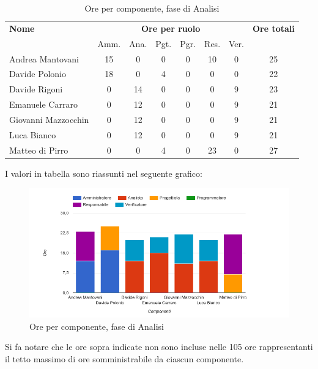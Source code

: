 \begin{table}[H]
\begin{tabular}{lccccccc}
\toprule
    \textbf{Nome}  & \multicolumn{6}{c}{\textbf{Ore per ruolo}} & \textbf{Ore totali} \\
     & Amm. & Ana. & Pgt. & Pgr. & Res. & Ver. & \\
    \midrule
    
	   Andrea Mantovani & 15 & 0 & 0 & 0 & 10 & 0 & 25 \\
	     Davide Polonio & 18 & 0 & 4 & 0 & 0 & 0 & 22 \\
	      Davide Rigoni & 0 & 14 & 0 & 0 & 0 & 9 & 23 \\
	   Emanuele Carraro & 0 & 12 & 0 & 0 & 0 & 9 & 21 \\
	Giovanni Mazzocchin & 0 & 12 & 0 & 0 & 0 & 9 & 21 \\
	        Luca Bianco & 0 & 12 & 0 & 0 & 0 & 9 & 21 \\
	    Matteo di Pirro & 0 & 0 & 4 & 0 & 23 & 0 & 27 \\
    
    \bottomrule
\end{tabular}
\caption{Ore per componente, fase di Analisi}
\end{table}


I valori in tabella sono riassunti nel seguente grafico: \\ 

    \begin{figure}[H]
      \begin{center}
        \includegraphics[width=12cm]{res/img/orePerComponenteAnalisi.png}
      \caption{Ore per componente, fase di Analisi}
      \end{center} 
    \end{figure}    
    
Si fa notare che le ore sopra indicate non sono incluse nelle 105 ore rappresentanti il tetto massimo di ore somministrabile da ciascun componente.


